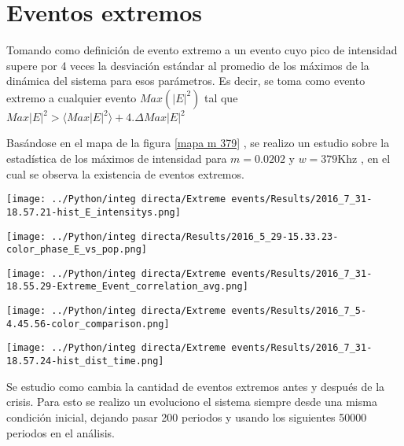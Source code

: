 
\chapter{Eventos extremos}
	
	Tomando como definición de evento extremo a un evento cuyo pico de intensidad supere por 4 veces la desviación estándar al promedio de los máximos de la dinámica del sistema para esos parámetros.
	Es decir, se toma como evento extremo a cualquier evento $Max(|E|^2)$ tal que $Max|E|^2> \langle Max|E|^2 \rangle + 4.\Delta Max|E|^2$
	
	Basándose en el mapa de la figura \ref{mapa m 379} , se realizo un estudio sobre la estadística 	de los máximos de intensidad para $m=0.0202$ y $w=379$Khz , en el cual se observa la existencia de eventos extremos. 
		
	\begin{center}
		\texttt{[image: ../Python/integ directa/Extreme events/Results/2016\_7\_31-18.57.21-hist\_E\_intensitys.png]}
	\end{center}
	\begin{center}
		\texttt{[image: ../Python/integ directa/Results/2016\_5\_29-15.33.23-color\_phase\_E\_vs\_pop.png]}
	\end{center}	
	
	\begin{center}
		\texttt{[image: ../Python/integ directa/Extreme events/Results/2016\_7\_31-18.55.29-Extreme\_Event\_correlation\_avg.png]}
	\end{center}
	\begin{center}
		\texttt{[image: ../Python/integ directa/Extreme events/Results/2016\_7\_5-4.45.56-color\_comparison.png]}
	\end{center}
	
	\begin{center}
		\texttt{[image: ../Python/integ directa/Extreme events/Results/2016\_7\_31-18.57.24-hist\_dist\_time.png]}
	\end{center}

	
	Se estudio como cambia la cantidad de eventos extremos antes y después de la crisis.
	Para esto se realizo un evoluciono el sistema siempre desde una misma condición inicial, dejando pasar 200 periodos y usando los siguientes 50000 periodos en el análisis.
	
